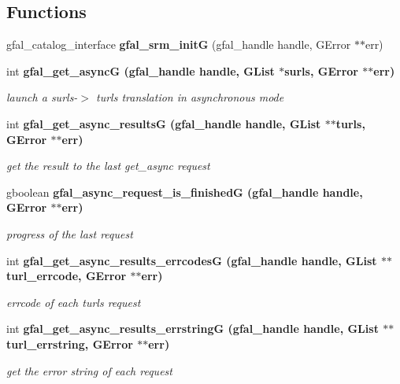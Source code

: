 \subsection*{Functions}
\begin{CompactItemize}
\item 
gfal\_\-catalog\_\-interface \textbf{gfal\_\-srm\_\-init\-G} (gfal\_\-handle handle, GError $\ast$$\ast$err)\label{gfal__common__srm_8h_0f8ff443c68a9f6177d717ad52b7d5a5}

\item 
int \bf{gfal\_\-get\_\-async\-G} (gfal\_\-handle handle, GList $\ast$surls, GError $\ast$$\ast$err)
\begin{CompactList}\small\item\em launch a surls-$>$ turls translation in asynchronous mode \item\end{CompactList}\item 
int \bf{gfal\_\-get\_\-async\_\-results\-G} (gfal\_\-handle handle, GList $\ast$$\ast$turls, GError $\ast$$\ast$err)
\begin{CompactList}\small\item\em get the result to the last get\_\-async request \item\end{CompactList}\item 
gboolean \bf{gfal\_\-async\_\-request\_\-is\_\-finished\-G} (gfal\_\-handle handle, GError $\ast$$\ast$err)
\begin{CompactList}\small\item\em progress of the last request \item\end{CompactList}\item 
int \bf{gfal\_\-get\_\-async\_\-results\_\-errcodes\-G} (gfal\_\-handle handle, GList $\ast$$\ast$turl\_\-errcode, GError $\ast$$\ast$err)
\begin{CompactList}\small\item\em errcode of each turls request \item\end{CompactList}\item 
int \bf{gfal\_\-get\_\-async\_\-results\_\-errstring\-G} (gfal\_\-handle handle, GList $\ast$$\ast$turl\_\-errstring, GError $\ast$$\ast$err)
\begin{CompactList}\small\item\em get the error string of each request \item\end{CompactList}\item 

\end{CompactItemize}

